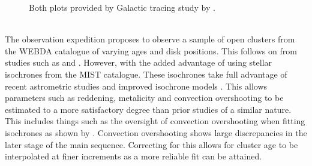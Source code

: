 \begin{figure}[h!]
    \centering
    \qquad
    \caption{Both plots provided by Galactic tracing study by \cite{2020A&A...640A...1C}.}%
    \label{fig:theory.}%
\end{figure}

\smallskip
{}
\smallskip\\
The observation expedition proposes to observe a sample of open clusters from the WEBDA catalogue of varying ages and disk positions. This follows on from studies such as \cite{1982A&A...109..213L} and \cite{2004PASP..116..997V}. However, with the added advantage of using stellar isochrones from the MIST catalogue. These isochrones take full advantage of recent astrometric studies and improved isochrone models \citep[see.][]{2016ApJ...823..102C}. This allows parameters such as reddening, metalicity and convection overshooting to be estimated to a more satisfactory degree than prior studies of a similar nature. This includes things such as the oversight of convection overshooting when fitting isochrones as shown by \cite{2004PASP..116..997V}. Convection overshooting shows large discrepancies in the later stage of the main sequence. Correcting for this allows for cluster age to be interpolated at finer increments as a more reliable fit can be attained. 

